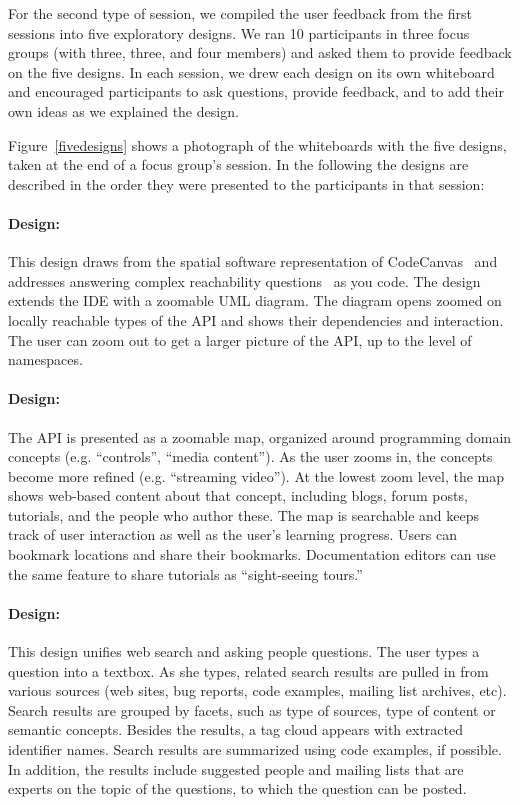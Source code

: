 For the second type of session, we compiled the user feedback from the first sessions into five exploratory designs. We ran 10 participants in three focus groups (with three, three, and four members) and asked them to provide feedback on the five designs. In each session, we drew each design on its own whiteboard and encouraged participants to ask questions, provide feedback, and to add their own ideas as we explained the design. 

Figure~\ref{fivedesigns} shows a photograph of the whiteboards with the five designs, taken at the end of a focus group's session. In the following the designs are described in the order they were presented to the participants in that session:

\moarsauce
\paragraph{Design: \ZoomableUML} 
This design draws from the spatial software representation of CodeCanvas~\cite{Deline2010a} and addresses answering complex reachability questions~\cite{Latoza2010a} as you code. The design extends the IDE with a zoomable UML diagram. The diagram opens zoomed on locally reachable types of the API and shows their dependencies and interaction. The user can zoom out to get a larger picture of the API, up to the level of namespaces.

\moarsauce
\paragraph{Design: \ConceptMap} 
The API is presented as a zoomable map, organized around programming domain concepts (e.g. ``controls'', ``media content''). As the user zooms in, the concepts become more refined (e.g. ``streaming video''). At the lowest zoom level, the map shows web-based content about that concept, including blogs, forum posts, tutorials, and the people who author these.
The map is searchable and keeps track of user interaction as well as the user's learning progress. Users can bookmark locations and share their bookmarks. Documentation editors can use the same feature to share tutorials as ``sight-seeing tours.''

\moarsauce
\paragraph{Design: \FacettedSearch}
This design unifies web search and asking people questions. The user types a question into a textbox. As she types, related  search results are pulled in from various sources (web sites, bug reports, code examples, mailing list archives, etc). Search results are grouped by facets, such as type of sources, type of content or semantic concepts. Besides the results, a tag cloud appears with extracted identifier names. Search results are summarized using code examples, if possible. In addition, the results include suggested people and mailing lists that are experts on the topic of the questions, to which the question can be posted.


